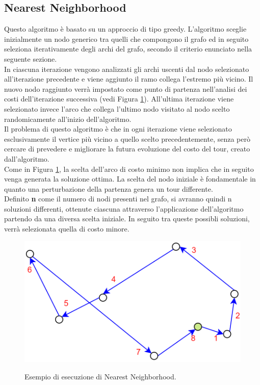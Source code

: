 \subsection{Nearest Neighborhood}
Questo algoritmo è basato su un approccio di tipo greedy. L'algoritmo sceglie inizialmente un nodo generico tra quelli che compongono il grafo ed in seguito seleziona iterativamente degli archi del grafo, secondo il criterio enunciato nella seguente sezione.\\
In ciascuna iterazione vengono analizzati gli archi uscenti dal nodo selezionato all'iterazione precedente e viene aggiunto il ramo collega l'estremo più vicino. Il nuovo nodo raggiunto verrà impostato come punto di partenza nell'analisi dei costi dell'iterazione successiva (vedi Figura \ref{nearest_neighborhood}).
All'ultima iterazione viene selezionato invece l'arco che collega l'ultimo nodo visitato al nodo scelto randomicamente all'inizio dell'algoritmo.\\
Il problema di questo algoritmo è che in ogni iterazione viene selezionato esclusivamente il vertice più vicino a quello scelto precedentemente, senza però cercare di prevedere e migliorare la futura evoluzione del costo del tour, creato dall'algoritmo.\\
Come in Figura \ref{nearest_neighborhood}, la scelta dell'arco di costo minimo non implica che in seguito venga generata la soluzione ottima. La scelta del nodo iniziale è fondamentale in quanto una perturbazione della partenza genera un tour differente.\\
Definito \textbf{n} come il numero di nodi presenti nel grafo, si avranno quindi n soluzioni differenti, ottenute ciascuna attraverso l'applicazione dell'algoritmo partendo da una diversa scelta iniziale. In seguito tra queste possibli soluzioni, verrà selezionata quella di costo minore.\\
\begin{figure}[H] 
\begin{center} 
  \includegraphics[scale=0.4]{Images/nearest_neighborhood}\\ 
  \caption{\footnotesize{Esempio di esecuzione di Nearest Neighborhood.}}
  \label{nearest_neighborhood} 
\end{center} 
\end{figure}

